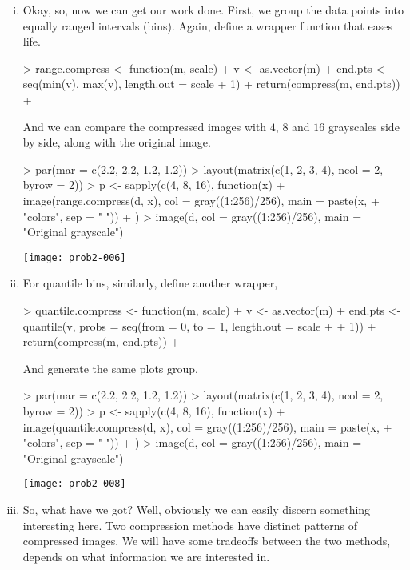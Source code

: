 \begin{enumerate}[(a)]
    \begin{enumerate}[i.]
    \item Okay, so, now we can get our work done. First, we group the data points into equally ranged intervals (bins). Again, define a wrapper function that eases life.
\begin{Schunk}
\begin{Sinput}
> range.compress <- function(m, scale) {
+     v <- as.vector(m)
+     end.pts <- seq(min(v), max(v), length.out = scale + 1)
+     return(compress(m, end.pts))
+ }
\end{Sinput}
\end{Schunk}
    And we can compare the compressed images with $4$, $8$ and $16$ grayscales side by side, along with the original image.
\begin{Schunk}
\begin{Sinput}
> par(mar = c(2.2, 2.2, 1.2, 1.2))
> layout(matrix(c(1, 2, 3, 4), ncol = 2, byrow = 2))
> p <- sapply(c(4, 8, 16), function(x) {
+     image(range.compress(d, x), col = gray((1:256)/256), main = paste(x, 
+         "colors", sep = " "))
+ })
> image(d, col = gray((1:256)/256), main = "Original grayscale")
\end{Sinput}
\end{Schunk}
\texttt{[image: prob2-006]}
    \item For quantile bins, similarly, define another wrapper,
\begin{Schunk}
\begin{Sinput}
> quantile.compress <- function(m, scale) {
+     v <- as.vector(m)
+     end.pts <- quantile(v, probs = seq(from = 0, to = 1, length.out = scale + 
+         1))
+     return(compress(m, end.pts))
+ }
\end{Sinput}
\end{Schunk}
    And generate the same plots group.
\begin{Schunk}
\begin{Sinput}
> par(mar = c(2.2, 2.2, 1.2, 1.2))
> layout(matrix(c(1, 2, 3, 4), ncol = 2, byrow = 2))
> p <- sapply(c(4, 8, 16), function(x) {
+     image(quantile.compress(d, x), col = gray((1:256)/256), main = paste(x, 
+         "colors", sep = " "))
+ })
> image(d, col = gray((1:256)/256), main = "Original grayscale")
\end{Sinput}
\end{Schunk}
\texttt{[image: prob2-008]}
    \item
    So, what have we got? Well, obviously we can easily discern something interesting here. Two compression methods have distinct patterns of compressed images. We will have some tradeoffs between the two methods, depends on what information we are interested in.


\end{enumerate}
\end{enumerate}
